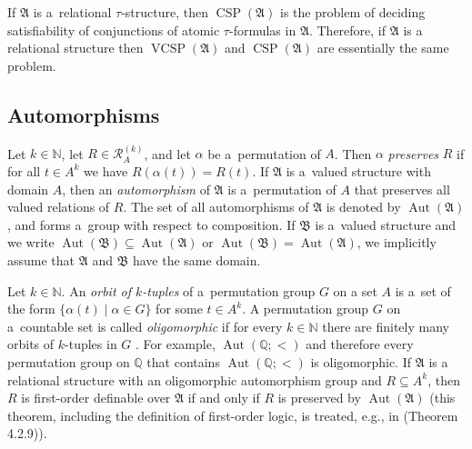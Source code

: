 \documentclass[preprint,12pt]{elsarticle}
\newcommand{\Q}{\mathbb Q}
\newcommand{\bA}{{\mathfrak A}}
\newcommand{\bB}{{\mathfrak B}}
\DeclareMathOperator{\Aut}{Aut}
\DeclareMathOperator{\VCSP}{VCSP}
\DeclareMathOperator{\CSP}{CSP}
\begin{document}
If $\bA$ is a~relational $\tau$-structure, then $\CSP(\bA)$ is the problem of deciding satisfiability of conjunctions of atomic $\tau$-formulas in $\bA$.
Therefore, if $\bA$ is a relational structure then $\VCSP(\bA)$ and $\CSP(\bA)$ are essentially the same problem.  

\subsection{Automorphisms} \label{sect:aut}

Let $k \in {\mathbb N}$, 
let $R \in {\mathscr R}^{(k)}_A$, and let $\alpha$ be a~permutation of $A$. Then $\alpha$ \emph{preserves} $R$ if for all $t \in A^k$
we have $R(\alpha(t)) = R(t)$. 
If $\bA$ is a~valued structure with domain $A$, then 
an \emph{automorphism} of $\bA$ is a~permutation of $A$ that preserves all valued relations of $R$. 
The set of all automorphisms of $\bA$ is denoted by $\Aut(\bA)$, and forms a~group with respect to composition. If $\bB$ is a~valued structure and we write $\Aut(\bB) \subseteq \Aut(\bA)$ or $\Aut(\bB) = \Aut(\bA)$, we implicitly assume that $\bA$ and $\bB$ have the same domain.

Let $k \in {\mathbb N}$. 
An \emph{orbit of $k$-tuples} of a~permutation group $G$ on a set $A$ is a~set of the form $\{ \alpha(t) \mid \alpha \in G \}$ for some $t \in A^k$. 
A permutation group $G$ on a~countable set is called \emph{oligomorphic} if for every $k \in {\mathbb N}$ there are finitely many orbits of $k$-tuples in $G$ \cite{Oligo}. For example, $\Aut(\Q; <)$ and therefore every permutation group on $\Q$ that contains $\Aut(\Q; <)$ is oligomorphic. If $\bA$ is a relational structure with an oligomorphic automorphism group and $R \subseteq A^k$, then $R$ is first-order definable over $\bA$ if and only if $R$ is preserved by $\Aut(\bA)$ (this theorem, including the definition of first-order logic, is treated, e.g., in \cite{Book} (Theorem 4.2.9)).
\end{document}
